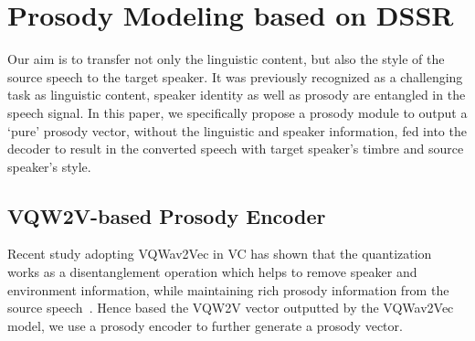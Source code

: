 \documentclass{article}
\begin{document}



\section{Prosody Modeling based on DSSR}

Our aim is to transfer not only the linguistic content, but also the style of the source speech to the target speaker. It was previously recognized as a challenging task as linguistic content, speaker identity as well as prosody are entangled in the speech signal. In this paper, we specifically propose a prosody module to output a `pure' prosody vector,  without the linguistic and speaker information, fed into the decoder to result in the converted speech with target speaker's timbre and source speaker's style.

\subsection{VQW2V-based Prosody Encoder}
\label{ssec:subhead}




Recent study adopting VQWav2Vec in VC has shown that the quantization works as a disentanglement operation which helps to remove speaker and environment information, while maintaining rich prosody information from the source speech~\cite{huang2021any, 2019Unsupervised}. Hence based the VQW2V vector outputted by the VQWav2Vec model, we use a prosody encoder to further generate a prosody vector.
\end{document}
